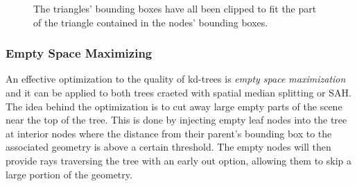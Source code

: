 \begin{figure}
  \centering

  \hspace{5mm}
  \hspace{5mm}

  \vspace{3mm}
  \parbox{10cm}{ \caption[Triangle clipping.]{The triangles' bounding boxes have
      all been clipped to fit the part of the triangle contained in the nodes'
      bounding boxes.}\label{fig:aabbClipped}}
\end{figure}


\subsubsection{Empty Space Maximizing}\label{sec:emptySpace}

An effective optimization to the quality of kd-trees is \textit{empty space
  maximization} and it can be applied to both trees craeted with spatial median
splitting or SAH. The idea behind the optimization is to cut away large empty
parts of the scene near the top of the tree. This is done by injecting empty
leaf nodes into the tree at interior nodes where the distance from their
parent's bounding box to the associated geometry is above a certain
threshold. The empty nodes will then provide rays traversing the tree with an
early out option, allowing them to skip a large portion of the geometry.

